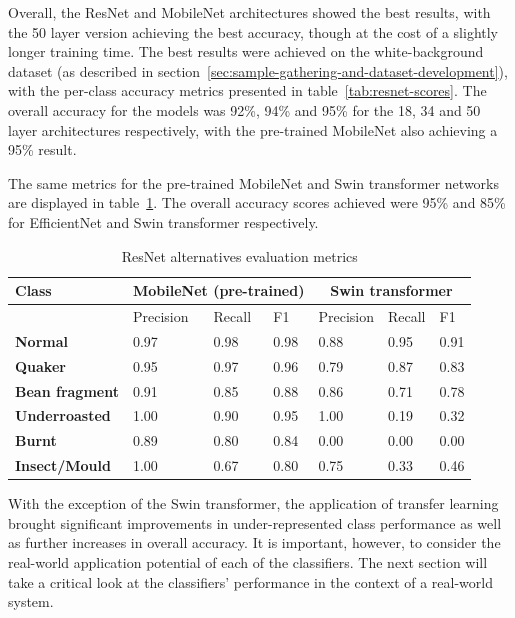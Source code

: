 Overall, the ResNet and MobileNet architectures showed the best results, with the 50 layer version achieving the best accuracy, though at the cost of a slightly longer
training time.
The best results were achieved on the white-background dataset (as described in section~\ref{sec:sample-gathering-and-dataset-development}),
with the per-class accuracy metrics presented in table~\ref{tab:resnet-scores}.
The overall accuracy for the models was 92\%, 94\% and 95\% for the 18, 34 and 50 layer architectures respectively, with the
pre-trained MobileNet also achieving a 95\% result.

The same metrics for the pre-trained MobileNet and Swin transformer networks are displayed in table~\ref{tab:transfer-results-2}.
The overall accuracy scores achieved were 95\% and 85\% for EfficientNet and Swin transformer respectively.

\begin{table}[h]
    \centering
    \begin{tabular}{*7l}
        \toprule
        \textbf{Class} & \multicolumn{3}{c}{MobileNet (pre-trained)} & \multicolumn{3}{c}{Swin transformer} \\
        \midrule
        {} & Precision & Recall & F1 & Precision & Recall & F1 \\
        \textbf{Normal} & 0.97 & 0.98 & 0.98 & 0.88 & 0.95 & 0.91  \\
        \textbf{Quaker} & 0.95 & 0.97 & 0.96 & 0.79 & 0.87 & 0.83 \\
        \textbf{Bean fragment} & 0.91 & 0.85 & 0.88 & 0.86 & 0.71 & 0.78 \\
        \textbf{Underroasted} & 1.00 & 0.90 & 0.95 & 1.00 & 0.19 & 0.32 \\
        \textbf{Burnt} & 0.89 & 0.80 & 0.84 & 0.00 & 0.00 & 0.00 \\
        \textbf{Insect/Mould} & 1.00 & 0.67 & 0.80 & 0.75 & 0.33 & 0.46  \\
        \bottomrule
    \end{tabular}
    \caption{ResNet alternatives evaluation metrics}
    \label{tab:transfer-results-2}
\end{table}
With the exception of the Swin transformer, the application of transfer learning brought significant improvements in
under-represented class performance as well as further increases in overall accuracy.
It is important, however, to consider the real-world application potential of each of the classifiers.
The next section will take a critical look at the classifiers' performance in the context of a real-world system.
